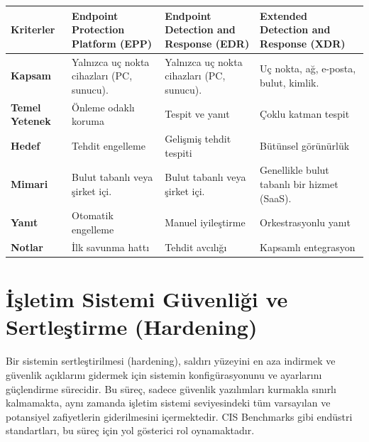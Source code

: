 \begin{longtable}{|p{4cm}|p{4cm}|p{4cm}|p{4cm}|}
\hline
\textbf{Kriterler} & \textbf{Endpoint Protection Platform (EPP)} & \textbf{Endpoint Detection and Response (EDR)} & \textbf{Extended Detection and Response (XDR)} \\
\hline
\textbf{Kapsam} & Yalnızca uç nokta cihazları (PC, sunucu). & Yalnızca uç nokta cihazları (PC, sunucu). & Uç nokta, ağ, e-posta, bulut, kimlik. \\
\hline
\textbf{Temel Yetenek} & Önleme odaklı koruma & Tespit ve yanıt & Çoklu katman tespit \\
\hline
\textbf{Hedef} & Tehdit engelleme & Gelişmiş tehdit tespiti & Bütünsel görünürlük \\
\hline
\textbf{Mimari} & Bulut tabanlı veya şirket içi. & Bulut tabanlı veya şirket içi. & Genellikle bulut tabanlı bir hizmet (SaaS). \\
\hline
\textbf{Yanıt} & Otomatik engelleme & Manuel iyileştirme & Orkestrasyonlu yanıt \\
\hline
\textbf{Notlar} & İlk savunma hattı & Tehdit avcılığı & Kapsamlı entegrasyon \\
\hline
\end{longtable}

\section{İşletim Sistemi Güvenliği ve Sertleştirme (Hardening)}

Bir sistemin sertleştirilmesi (hardening), saldırı yüzeyini en aza indirmek ve güvenlik açıklarını gidermek için sistemin konfigürasyonunu ve ayarlarını güçlendirme sürecidir. Bu süreç, sadece güvenlik yazılımları kurmakla sınırlı kalmamakta, aynı zamanda işletim sistemi seviyesindeki tüm varsayılan ve potansiyel zafiyetlerin giderilmesini içermektedir. CIS Benchmarks gibi endüstri standartları, bu süreç için yol gösterici rol oynamaktadır.

